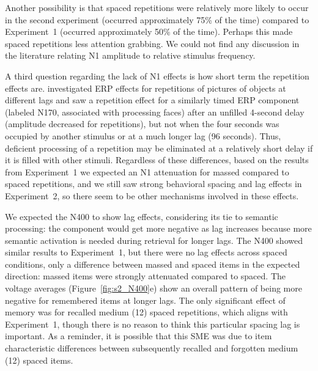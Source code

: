 Another possibility is that spaced repetitions were relatively more likely to occur in the second experiment (occurred approximately 75\% of the time) compared to Experiment~1 (occurred approximately 50\% of the time).  Perhaps this made spaced repetitions less attention grabbing.  We could not find any discussion in the literature relating N1 amplitude to relative stimulus frequency.


A third question regarding the lack of N1 effects is how short term the repetition effects are.   investigated ERP effects for repetitions of pictures of objects at different lags and saw a repetition effect for a similarly timed ERP component (labeled N170, associated with processing faces) after an unfilled 4-second delay (amplitude decreased for repetitions), but not when the four seconds was occupied by another stimulus or at a much longer lag (96 seconds).  Thus, deficient processing of a repetition may be eliminated at a relatively short delay if it is filled with other stimuli.  Regardless of these differences, based on the results from Experiment~1 we expected an N1 attenuation for massed compared to spaced repetitions, and we still saw strong behavioral spacing and lag effects in Experiment~2, so there seem to be other mechanisms involved in these effects.


We expected the N400 to show lag effects, considering its tie to semantic processing: the component would get more negative as lag increases because more semantic activation is needed during retrieval for longer lags.  The N400 showed similar results to Experiment~1, but there were no lag effects across spaced conditions, only a difference between massed and spaced items in the expected direction: massed items were strongly attenuated compared to spaced.  The voltage averages (Figure~\ref{fig:s2_N400}e) show an overall pattern of being more negative for remembered items at longer lags.  The only significant effect of memory was for recalled medium (12) spaced repetitions, which aligns with Experiment~1, though there is no reason to think this particular spacing lag is important.
As a reminder, it is possible that this SME was due to item characteristic differences between subsequently recalled and forgotten medium (12) spaced items.

